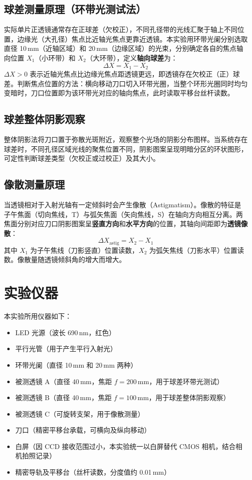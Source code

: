 \documentclass[12pt, a4paper]{article}
\begin{document}
\subsection{球差测量原理（环带光测试法）}
实际单片正透镜通常存在正球差（欠校正），不同孔径带的光线汇聚于轴上不同位置，边缘光（大孔径）焦点比近轴光焦点更靠近透镜。本实验用环带光阑分别选取直径 10\,mm（近轴区域）和 20\,mm（边缘区域）的光束，分别确定各自的焦点轴向位置 $X_1$（小环带）和 $X_2$（大环带），定义\textbf{轴向球差}为：
\begin{equation}
  \Delta X = X_1 - X_2
  \label{eq:spherical}
\end{equation}
$\Delta X > 0$ 表示近轴光焦点比边缘光焦点距透镜更远，即透镜存在欠校正（正）球差。判断焦点位置的方法：横向移动刀口切入环带光圈，当整个环形光圈同时均匀变暗时，刀口位置即为该环带光对应的轴向焦点，此时读取平移台丝杆读数。

\subsection{球差整体阴影观察}
整体阴影法将刀口置于弥散光斑附近，观察整个光场的阴影分布图样。当系统存在球差时，不同孔径区域光线的聚焦位置不同，阴影图案呈现明暗分区的环状图形，可定性判断球差类型（欠校正或过校正）及其大小。

\subsection{像散测量原理}
当透镜相对于入射光轴有一定倾斜时会产生像散（Astigmatism）。像散的特征是子午焦面（切向焦线，T）与弧矢焦面（矢向焦线，S）在轴向方向相互分离。两焦面分别对应刀口阴影图案呈\textbf{竖直方向}和\textbf{水平方向}的位置，其轴向间距即为\textbf{透镜像散}：
\begin{equation}
  \Delta X_{\mathrm{astig}} = X_2 - X_1
  \label{eq:astig}
\end{equation}
其中 $X_1$ 为子午焦线（刀影竖直）位置读数，$X_2$ 为弧矢焦线（刀影水平）位置读数。像散量随透镜倾斜角的增大而增大。
\section{实验仪器}
本实验所用仪器如下：
\begin{itemize}
  \item LED 光源（波长 690\,nm，红色）
  \item 平行光管（用于产生平行入射光）
  \item 环带光阑（直径 10\,mm 和 20\,mm 两种）
  \item 被测透镜 A（直径 40\,mm，焦距 $f = 200$\,mm，用于球差环带光测试）
  \item 被测透镜 B（直径 40\,mm，焦距 $f = 100$\,mm，用于球差整体阴影观察）
  \item 被测透镜 C（可旋转支架，用于像散测量）
  \item 刀口（精密平移台承载，可横向及纵向移动）
  \item 白屏（因 CCD 接收范围过小，本实验统一以白屏替代 CMOS 相机，结合相机拍照记录）
  \item 精密导轨及平移台（丝杆读数，分度值约 0.01\,mm）
\end{itemize}
\end{document}
